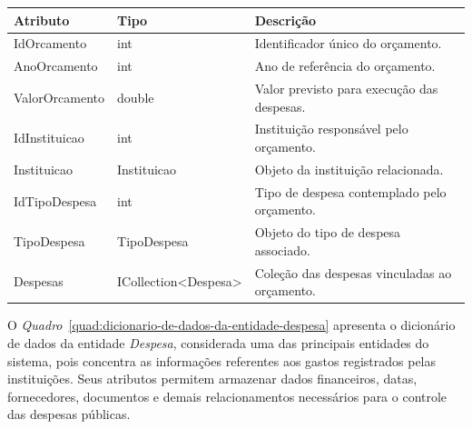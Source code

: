 \begin{quadro}[H]
\caption[Dicionário de dados da entidade Orcamento]{Dicionário de dados da entidade Orcamento}
\label{quad:dicionario-de-dados-da-entidade-orcamento}

\begin{tabular}{|p{}|p{}|p{}|}
\hline
\textbf{Atributo} & \textbf{Tipo} & \textbf{Descrição} \\ 
\hline
IdOrcamento & int & Identificador único do orçamento. \\ 
\hline
AnoOrcamento & int & Ano de referência do orçamento. \\ 
\hline
ValorOrcamento & double & Valor previsto para execução das despesas. \\ 
\hline
IdInstituicao & int & Instituição responsável pelo orçamento. \\ 
\hline
Instituicao & Instituicao & Objeto da instituição relacionada. \\ 
\hline
IdTipoDespesa & int & Tipo de despesa contemplado pelo orçamento. \\ 
\hline
TipoDespesa & TipoDespesa & Objeto do tipo de despesa associado. \\ 
\hline
Despesas & ICollection<Despesa> & Coleção das despesas vinculadas ao orçamento. \\ 
\hline
\end{tabular}


\end{quadro}


O \textit{Quadro}~\ref{quad:dicionario-de-dados-da-entidade-despesa} apresenta o dicionário de dados da entidade \textit{Despesa}, considerada uma das principais entidades do sistema, pois concentra as informações referentes aos gastos registrados pelas instituições. Seus atributos permitem armazenar dados financeiros, datas, fornecedores, documentos e demais relacionamentos necessários para o controle das despesas públicas.

